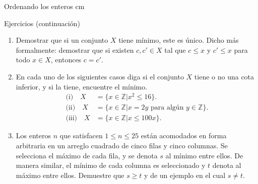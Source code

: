 \documentclass[11pt,spanish,makeidx]{amsbook}
\theoremstyle{definition}
\theoremstyle{remark}
\begin{document}
\begin{section}{Ordenando los enteros}
 cm

\begin{subsection}{Ejercicios} {\rm (continuación)}
\begin{enumerate}
\item Demostrar que si un conjunto $X$ tiene mínimo, este es único. Dicho más formalmente: demostrar que si existen $c,c' \in X$ tal que  $c\le x$ y $c'\le x$ para todo $x \in X$, entonces $c=c'$. 
\item En cada uno de los siguientes casos diga si el conjunto $X$ tiene o no una cota inferior, y si la tiene, encuentre el mínimo.
$$
\begin{aligned}
\text{(i)}\quad X &=\{x \in \mathbb Z | x^2\le 16\}. \\
\text{(ii)}\quad X &=\{x \in \mathbb Z | x=2y \text{\ para algún }
y \in
\mathbb Z\}. \\
\text{(iii)}\quad X &=\{x \in \mathbb Z | x\le 100x\} .
\end{aligned}
$$
\item Los enteros $n$ que satisfacen $1 \le n \le 25$ están acomodados en forma arbitraria en un arreglo cuadrado de cinco filas y cinco columnas. Se selecciona el máximo  de cada fila, y se denota $s$ al mínimo entre ellos. De manera similar, el mínimo de cada columna es seleccionado y $t$ denota al máximo entre ellos. Demuestre que $s\ge t$ y de un ejemplo en el cual $s\not=t$.
\end{enumerate}
\end{subsection}

\end{section}
\end{document}
